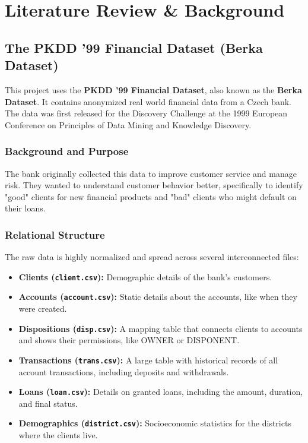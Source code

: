 \chapter{Literature Review \& Background}
\section{The PKDD '99 Financial Dataset (Berka Dataset)}
This project uses the \textbf{PKDD '99 Financial Dataset}, also known as the \textbf{Berka Dataset}. It contains anonymized real world financial data from a Czech bank. The data was first released for the Discovery Challenge at the 1999 European Conference on Principles of Data Mining and Knowledge Discovery.

\subsection*{Background and Purpose}
The bank originally collected this data to improve customer service and manage risk. They wanted to understand customer behavior better, specifically to identify "good" clients for new financial products and "bad" clients who might default on their loans.

\subsection*{Relational Structure}
The raw data is highly normalized and spread across several interconnected files:
\begin{itemize}
    \item \textbf{Clients (\texttt{client.csv}):} Demographic details of the bank's customers.
    \item \textbf{Accounts (\texttt{account.csv}):} Static details about the accounts, like when they were created.
    \item \textbf{Dispositions (\texttt{disp.csv}):} A mapping table that connects clients to accounts and shows their permissions, like OWNER or DISPONENT.
    \item \textbf{Transactions (\texttt{trans.csv}):} A large table with historical records of all account transactions, including deposits and withdrawals.
    \item \textbf{Loans (\texttt{loan.csv}):} Details on granted loans, including the amount, duration, and final status.
    \item \textbf{Demographics (\texttt{district.csv}):} Socioeconomic statistics for the districts where the clients live.
\end{itemize}

